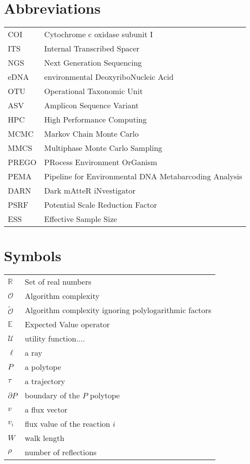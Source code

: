 \documentclass[master=elt, cleveref, autoref, masteroption=eg]{kulemt}
\def\RR{{\mathbb R}}
\newcommand{\OO}{\mathcal{O}\xspace}
\newcommand{\sO}{\widetilde{\mathcal{O}}\xspace}
\begin{document}
\section*{Abbreviations}
   \begin{flushleft}
   \renewcommand{\arraystretch}{1.1}
   \begin{tabularx}{\textwidth}{@{}p{12mm}X@{}}
      COI   & Cytochrome c oxidase subunit I\\
      ITS   & Internal Transcribed Spacer\\
      NGS   & Next Generation Sequencing\\
      eDNA  & environmental DeoxyriboNucleic Acid\\
      OTU   & Operational Taxonomic Unit\\
      ASV   & Amplicon Sequence Variant\\
      HPC   & High Performance Computing\\
      MCMC  & Markov Chain Monte Carlo\\
      MMCS  & Multiphase Monte Carlo Sampling\\
      PREGO & PRocess Environment OrGanism\\
      PEMA  & Pipeline for Environmental DNA Metabarcoding Analysis\\
      DARN  & Dark mAtteR iNvestigator\\
      PSRF  & Potential Scale Reduction Factor\\
      ESS   & Effective Sample Size\\
   \end{tabularx}
\end{flushleft}


\section*{Symbols}
   \begin{flushleft}
   \renewcommand{\arraystretch}{1.1}
   \begin{tabularx}{\textwidth}{@{}p{12mm}X@{}}
      $\RR$          & Set of real numbers\\
      $\OO$          & Algorithm complexity\\
      $\sO$          & Algorithm complexity ignoring polylogarithmic factors\\
      $\mathbb{E}$   & Expected Value operator\\
      $\mathcal{U}$  & utility function....\\
      $\ell$         & a ray\\
      $P$            & a polytope\\
      $\tau$         & a trajectory\\
      $\partial P$   & boundary of the $P$ polytope\\
      $v$            & a flux vector\\
      $v_i$          & flux value of the reaction $i$\\
      $W$            & walk length\\
      $\rho$         & number of reflections\\
   \end{tabularx}
\end{flushleft}
\end{document}

